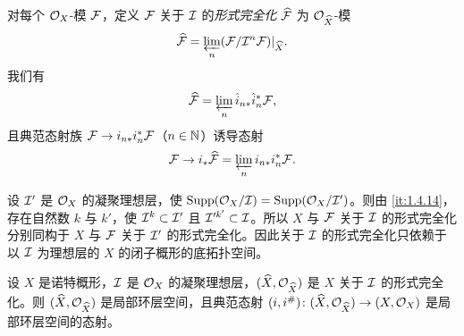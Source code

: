 
对每个 $\mathcal{O}_X$-模 $\mathcal{F}$，定义 $\mathcal{F}$ 关于 $\mathcal{I}$ 的\emph{形式完全化} $\widehat{\mathcal{F}}$ 为 $\mathcal{O}_{\widehat X}$-模
\[
\widehat{\mathcal{F}}=\varprojlim_n(\mathcal{F}/\mathcal{I}^n\mathcal{F})|_{\widehat X}.
\]
我们有
\[
\widehat{\mathcal{F}}=\varprojlim_n\hat i_{n*}\hat i_n^*\mathcal{F},
\]
且典范态射族 $\mathcal{F}\to i_{n*}i_n^*\mathcal{F}$（$n\in\mathbb{N}$）诱导态射
\[
\mathcal{F}\to i_*\widehat{\mathcal{F}}=\varprojlim_n i_{n*}i_n^*\mathcal{F}.
\]

设 $\mathcal{I}'$ 是 $\mathcal{O}_X$ 的凝聚理想层，使 $\operatorname{Supp}(\mathcal{O}_X/\mathcal{I})=\operatorname{Supp}(\mathcal{O}_X/\mathcal{I}')$。则由 \ref{it:1.4.14}，存在自然数 $k$ 与 $k'$，使 $\mathcal{I}^k\subset\mathcal{I}'$ 且 $\mathcal{I}'^{k'}\subset\mathcal{I}$。所以 $X$ 与 $\mathcal{F}$ 关于 $\mathcal{I}$ 的形式完全化分别同构于 $X$ 与 $\mathcal{F}$ 关于 $\mathcal{I}'$ 的形式完全化。因此关于 $\mathcal{I}$ 的形式完全化只依赖于以 $\mathcal{I}$ 为理想层的 $X$ 的闭子概形的底拓扑空间。

\begin{proposition}\label{it:1.5.12}
设 $X$ 是诺特概形，$\mathcal{I}$ 是 $\mathcal{O}_X$ 的凝聚理想层，$(\widehat X,\mathcal{O}_{\widehat X})$ 是 $X$ 关于 $\mathcal{I}$ 的形式完全化。则 $(\widehat X,\mathcal{O}_{\widehat X})$ 是局部环层空间，且典范态射 $(i,i^\#)\colon(\widehat X,\mathcal{O}_{\widehat X})\to(X,\mathcal{O}_X)$ 是局部环层空间的态射。
\end{proposition}

